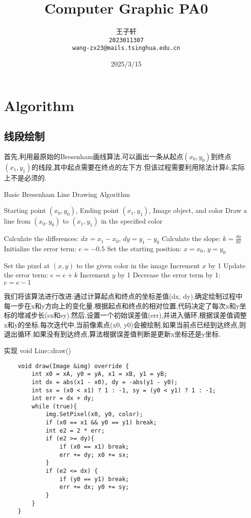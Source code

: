 \documentclass[a4paper,twoside]{article}
\title{Computer Graphic PA0}
\author{
  王子轩\\
  \texttt{2023011307} \\
  \texttt{wang-zx23@mails.tsinghua.edu.cn} \\
}
\date{2025/3/15}
\begin{document}
\maketitle
\section{Algorithm}
\subsection{线段绘制}
首先,利用最原始的Bresenham画线算法,可以画出一条从起点$(x_0,y_0)$到终点$(x_1, y_1)$的线段,其中起点需要在终点的左下方.但该过程需要利用除法计算$k$,实际上不是必须的.
\begin{algorithm}[H]
    \caption{Basic Bresenham Line Drawing Algorithm}
    \label{alg:bresenham}
    \begin{algorithmic}[1]
        \REQUIRE Starting point $(x_0, y_0)$, Ending point $(x_1, y_1)$, Image object, and color
        \ENSURE Draw a line from $(x_0, y_0)$ to $(x_1, y_1)$ in the specified color

        \STATE Calculate the differences: $dx = x_1 - x_0$, $dy = y_1 - y_0$
        \STATE Calculate the slope: $k = \frac{dy}{dx}$
        \STATE Initialize the error term: $e = -0.5$
        \STATE Set the starting position: $x = x_0$, $y = y_0$

            \STATE Set the pixel at $(x, y)$ to the given color in the image
            \STATE Increment $x$ by 1
            \STATE Update the error term: $e = e + k$
                \STATE Increment $y$ by 1
                \STATE Decrease the error term by 1: $e = e - 1$
            \ENDIF
        \ENDFOR
    \end{algorithmic}
\end{algorithm}
我们将该算法进行改进:通过计算起点和终点的坐标差值(dx, dy),确定绘制过程中每一步在x和y方向上的变化量.根据起点和终点的相对位置,代码决定了每次x和y坐标的增减步长(sx和sy).然后,设置一个初始误差值(err),并进入循环,根据误差值调整x和y的坐标.每次迭代中,当前像素点(x0, y0)会被绘制,如果当前点已经到达终点,则退出循环.如果没有到达终点,算法根据误差值判断是更新x坐标还是y坐标.
\begin{listing}[H]
	\caption{实现 void Line::draw()}
	\label{code:processdweet}
	\begin{verbatim}
    void draw(Image &img) override {
        int x0 = xA, y0 = yA, x1 = xB, y1 = yB;
        int dx = abs(x1 - x0), dy = -abs(y1 - y0);
        int sx = (x0 < x1) ? 1 : -1, sy = (y0 < y1) ? 1 : -1;
        int err = dx + dy;
        while (true){
            img.SetPixel(x0, y0, color);
            if (x0 == x1 && y0 == y1) break;
            int e2 = 2 * err;
            if (e2 >= dy){ 
                if (x0 == x1) break;
                err += dy; x0 += sx; 
            }
            if (e2 <= dx) {
                if (y0 == y1) break;
                err += dx; y0 += sy;  
            }
        }
    }
\end{verbatim}
\end{listing}
\end{document}
